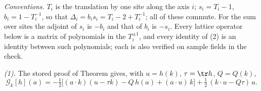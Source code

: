 \emph{Conventions.} $T_{i}$ is the translation by one site along the axis $i$; $s_{i} = T_{i} - 1$, $b_{i} = 1 - T_{i}^{-1}$, so that $\Delta_{i} = b_{i}s_{i} = T_{i} - 2 + T_{i}^{-1}$; all of these commute. For the sum over sites the adjoint of $s_{i}$ is $-b_{i}$ and that of $b_{i}$ is $-s_{i}$. Every lattice operator below is a matrix of polynomials in the $T_{i}^{\pm 1}$, and every identity of (2) is an identity between such polynomials; each is also verified on sample fields in the check.

\emph{(1).} The stored proof of Theorem  gives, with $u = h(k)$, $\tau = \tr h$, $Q = Q(k)$,
\[
\mathcal{G}_{k}[h](a) = -\tfrac12\bigl[(a\cdot k)(u - \tau k) - Q\,h(a) + (a\cdot u)\,k\bigr] + \tfrac12\,(k\cdot u - Q\tau)\,a .
\]
